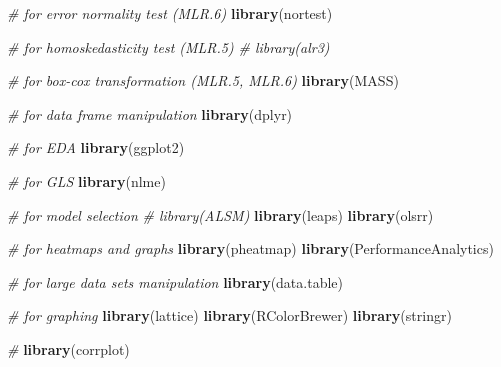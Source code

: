 \documentclass[
  12pt,
]{article}
\newenvironment{Shaded}{\begin{snugshade}}{\end{snugshade}}
\newcommand{\CommentTok}[1]{\textcolor[rgb]{0.56,0.35,0.01}{\textit{#1}}}
\newcommand{\FunctionTok}[1]{\textcolor[rgb]{0.13,0.29,0.53}{\textbf{#1}}}
\newcommand{\NormalTok}[1]{#1}
\begin{document}
\begin{Shaded}
\begin{Highlighting}[]
\CommentTok{\# for error normality test (MLR.6)}
\FunctionTok{library}\NormalTok{(nortest)}

\CommentTok{\# for homoskedasticity test (MLR.5)}
\CommentTok{\# library(alr3)}

\CommentTok{\# for box{-}cox transformation (MLR.5, MLR.6)}
\FunctionTok{library}\NormalTok{(MASS)}

\CommentTok{\# for data frame manipulation}
\FunctionTok{library}\NormalTok{(dplyr)}

\CommentTok{\# for EDA}
\FunctionTok{library}\NormalTok{(ggplot2)}

\CommentTok{\# for GLS}
\FunctionTok{library}\NormalTok{(nlme)}

\CommentTok{\# for model selection}
\CommentTok{\# library(ALSM)}
\FunctionTok{library}\NormalTok{(leaps)}
\FunctionTok{library}\NormalTok{(olsrr)}

\CommentTok{\# for heatmaps and graphs}
\FunctionTok{library}\NormalTok{(pheatmap)}
\FunctionTok{library}\NormalTok{(PerformanceAnalytics)}

\CommentTok{\# for large data sets manipulation}
\FunctionTok{library}\NormalTok{(data.table)}

\CommentTok{\# for graphing}
\FunctionTok{library}\NormalTok{(lattice)}
\FunctionTok{library}\NormalTok{(RColorBrewer)}
\FunctionTok{library}\NormalTok{(stringr)}

\CommentTok{\# }
\FunctionTok{library}\NormalTok{(corrplot)}
\end{Highlighting}
\end{Shaded}
\end{document}
